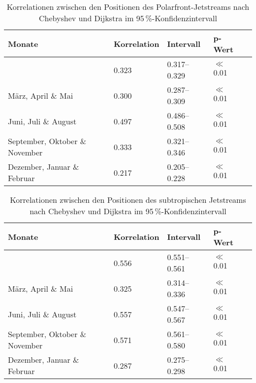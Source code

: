 \begin{table}[hbt] 
\caption[Korrelationen zwischen Chebyshev- und Dijkstra-Methode für den Polarfrontjet]{Korrelationen zwischen den Positionen des Polarfront-Jetstreams nach Chebyshev und Dijkstra im 95\,\%-Konfidenzintervall} \label{tab:korrelationen-dijk-cheb-pfj}
\begin{tabularx}{\textwidth}{|X|X|X|X|X|}
  \hline
  Monate & Korrelation & Intervall & p-Wert \\
  \hline \hline
   & \num{0.323} & \numrange[range-phrase = ;\,]{0.317}{0.329} & $\ll$ \num{0.01} \\
  \hline
  März, April \& Mai & \num{0.300} & \numrange[range-phrase = ;\,]{0.287}{0.309} & $\ll$ \num{0.01} \\
  \hline
  Juni, Juli \& August & \num{0.497} & \numrange[range-phrase = ;\,]{0.486}{0.508} & $\ll$ \num{0.01} \\
  \hline
  September, Oktober \& November & \num{0.333} & \numrange[range-phrase = ;\,]{0.321}{0.346} & $\ll$ \num{0.01} \\
  \hline
  Dezember, Januar \& Februar & \num{0.217} & \numrange[range-phrase = ;\,]{0.205}{0.228} & $\ll$ \num{0.01} \\
  \hline
\end{tabularx}
\end{table}

\begin{table}[hbt] 
\caption[Korrelationen zwischen Chebyshev- und Dijkstra-Methode für den Subtropenjet]{Korrelationen zwischen den Positionen des subtropischen Jetstreams nach Chebyshev und Dijkstra im 95\,\%-Konfidenzintervall} \label{tab:korrelationen-dijk-cheb-stj}
\begin{tabularx}{\textwidth}{|X|X|X|X|X|}
  \hline
  Monate & Korrelation & Intervall & p-Wert \\
  \hline \hline
   & \num{0.556} & \numrange[range-phrase = ;\,]{0.551}{0.561} & $\ll$ \num{0.01} \\
  \hline
  März, April \& Mai & \num{0.325} & \numrange[range-phrase = ;\,]{0.314}{0.336} & $\ll$ \num{0.01} \\
  \hline
  Juni, Juli \& August & \num{0.557} & \numrange[range-phrase = ;\,]{0.547}{0.567} & $\ll$ \num{0.01} \\
  \hline
  September, Oktober \& November & \num{0.571} & \numrange[range-phrase = ;\,]{0.561}{0.580} & $\ll$ \num{0.01} \\
  \hline
  Dezember, Januar \& Februar & \num{0.287} & \numrange[range-phrase = ;\,]{0.275}{0.298} & $\ll$ \num{0.01} \\
  \hline
\end{tabularx}
\end{table}
